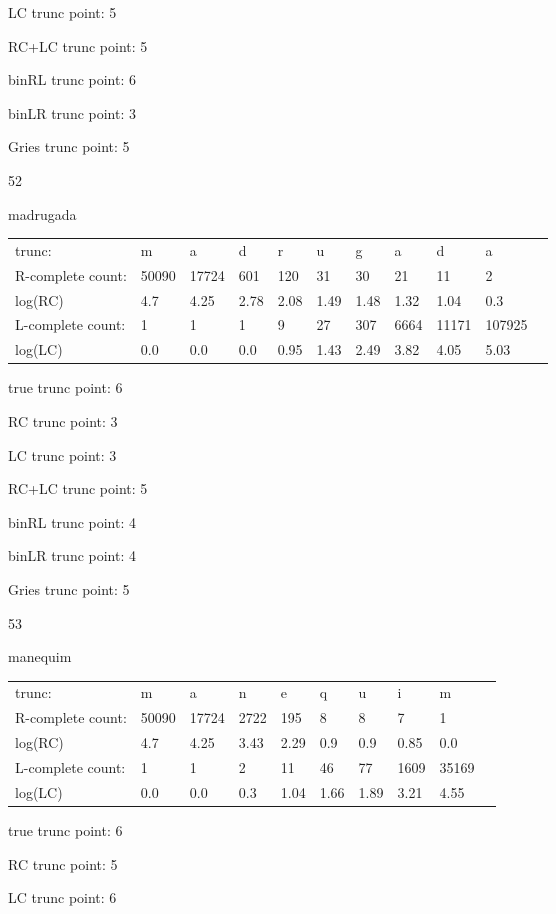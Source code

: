\documentclass[10pt]{article}
\begin{document}
LC trunc point: 5

RC+LC trunc point: 5

binRL trunc point: 6

binLR trunc point: 3

Gries trunc point: 5

\vspace{1em}

52

madrugada

\begin{tabular}{l|llllllllll}
trunc: & m & a & d & r & u & g & a & d & a & \\ 
R-complete count: & 50090 & 17724 & 601 & 120 & 31 & 30 & 21 & 11 & 2 & \\ 
log(RC) & 4.7 & 4.25 & 2.78 & 2.08 & 1.49 & 1.48 & 1.32 & 1.04 & 0.3 & \\ 
L-complete count: & 1 & 1 & 1 & 9 & 27 & 307 & 6664 & 11171 & 107925 & \\ 
log(LC) & 0.0 & 0.0 & 0.0 & 0.95 & 1.43 & 2.49 & 3.82 & 4.05 & 5.03 & \\ 
\end{tabular}

true trunc point: 6

RC trunc point: 3

LC trunc point: 3

RC+LC trunc point: 5

binRL trunc point: 4

binLR trunc point: 4

Gries trunc point: 5

\newpage

53

manequim

\begin{tabular}{l|lllllllll}
trunc: & m & a & n & e & q & u & i & m & \\ 
R-complete count: & 50090 & 17724 & 2722 & 195 & 8 & 8 & 7 & 1 & \\ 
log(RC) & 4.7 & 4.25 & 3.43 & 2.29 & 0.9 & 0.9 & 0.85 & 0.0 & \\ 
L-complete count: & 1 & 1 & 2 & 11 & 46 & 77 & 1609 & 35169 & \\ 
log(LC) & 0.0 & 0.0 & 0.3 & 1.04 & 1.66 & 1.89 & 3.21 & 4.55 & \\ 
\end{tabular}

true trunc point: 6

RC trunc point: 5

LC trunc point: 6
\end{document}
